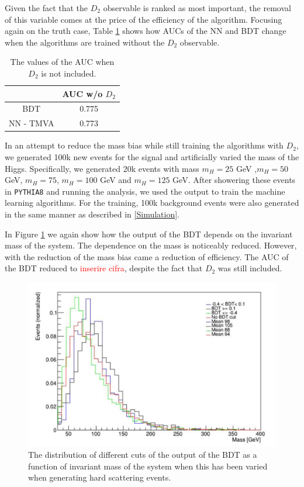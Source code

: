 \documentclass[10pt,a4paper]{book}
\newcommand\todo[1]{\textcolor{red}{#1}}
\def\code#1{\texttt{#1}}
\begin{document}
Given the fact that the $D_2$ observable is ranked as most important, the removal of this variable comes at the price of the efficiency of the algorithm. Focusing again on the truth case, Table \ref{AUC table} shows how AUCs of the NN and BDT change when the algorithms are trained without the $D_2$ observable.

\begin{table}
\centering
\begin{tabular}{|c|c|}
\hline 
\* & AUC w/o $D_2$ \\ 
\hline 
BDT & 0.775 \\ 
\hline 
NN - TMVA & 0.773 \\ 
\hline 
\end{tabular}
\caption{The values of the AUC when $D_2$ is not included.}
\label{AUC table}
\end{table}

In an attempt to reduce the mass bias while still training the algorithms with $D_2$, we generated 100k new events for the signal and artificially varied the mass of the Higgs. Specifically, we generated 20k events with mass $m_H = 25$ GeV ,$m_H = 50$ GeV, $m_H = 75$, $m_H = 100$ GeV and $m_H = 125$ GeV. After showering these events in \code{PYTHIA8} and running the analysis, we used the output to train the machine learning algorithms. For the training, 100k background events were also generated in the same manner as described in \ref{Simulation}.

In Figure \ref{bdt inv mass} we again show how the output of the BDT depends on the invariant mass of the system. The dependence on the mass is noticeably reduced. However, with the reduction of the mass bias came a reduction of efficiency. The AUC of the BDT reduced to \todo{inserire cifra}, despite the fact that $D_2$ was still included.
\begin{figure}
\centering
\includegraphics[scale=0.5]{ch4_images/bdt_inv_mass}
\caption{The distribution of different cuts of the output of the BDT as a function of invariant mass of the system when this has been varied when generating hard scattering events.}
\label{bdt inv mass}
\end{figure}
\end{document}
